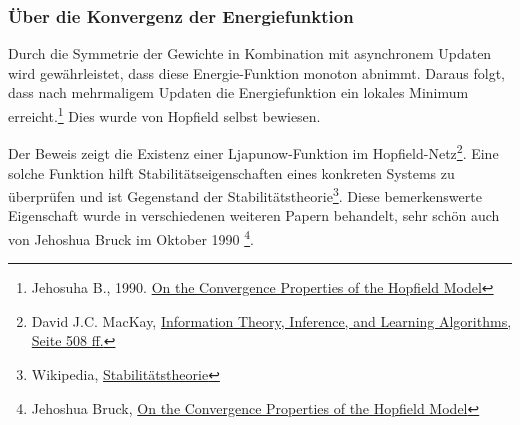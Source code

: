 \subsubsection*{Über die Konvergenz der Energiefunktion}

Durch die Symmetrie der Gewichte in Kombination mit asynchronem Updaten wird gewährleistet, dass diese Energie-Funktion monoton abnimmt. Daraus folgt, dass nach mehrmaligem Updaten die Energiefunktion ein lokales Minimum erreicht.\footnote{Jehosuha B., 1990. \href{ http://www.paradise.caltech.edu/CNS188/bruck90-conv.pdf}{On the Convergence Properties of the
Hopfield Model}} Dies wurde von Hopfield selbst bewiesen.

Der Beweis zeigt die Existenz einer Ljapunow-Funktion im Hopfield-Netz\footnote{David J.C. MacKay, \href{https://www.inference.org.uk/itprnn/book.pdf}{Information Theory, Inference, and Learning Algorithms, Seite 508 ff.}}. Eine solche Funktion hilft Stabilitätseigenschaften eines konkreten Systems zu überprüfen und ist Gegenstand der Stabilitätstheorie\footnote{Wikipedia, \href{https://de.wikipedia.org/wiki/Stabilitätstheorie}{Stabilitätstheorie}}. Diese bemerkenswerte Eigenschaft wurde in verschiedenen weiteren Papern behandelt, sehr schön auch von Jehoshua Bruck im Oktober 1990 \footnote{Jehoshua Bruck, \href{http://www.paradise.caltech.edu/CNS188/bruck90-conv.pdf}{On the Convergence Properties of the Hopfield Model}}.